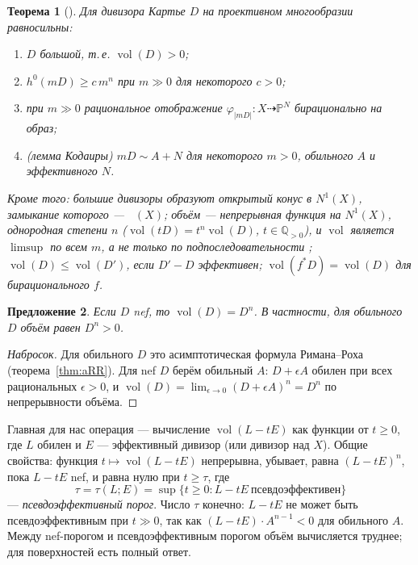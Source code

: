 \documentclass[11pt,a4paper]{article}
\theoremstyle{plain}
\newtheorem{theorem}{Теорема}[section]
\newtheorem{proposition}[theorem]{Предложение}
\theoremstyle{definition}
\theoremstyle{remark}
\newcommand{\Q}{\mathbb{Q}}
\newcommand{\PP}{\mathbb{P}}
\DeclareMathOperator{\vol}{vol}
\DeclareMathOperator{\Eff}{\overline{Eff}}
\begin{document}
\begin{theorem}[{\cite[2.2]{La}}]\label{thm:big}
Для дивизора Картье $D$ на проективном многообразии равносильны:
\begin{enumerate}
\item $D$ большой, т.\,е. $\vol(D)>0$;
\item $h^0(mD)\ge c\,m^n$ при $m\gg0$ для некоторого $c>0$;
\item при $m\gg0$ рациональное отображение $\varphi_{|mD|}\colon X\dashrightarrow\PP^N$ бирационально
на образ;
\item (\emph{лемма Кодаиры}) $mD\sim A+N$ для некоторого $m>0$, обильного $A$ и эффективного $N$.
\end{enumerate}
Кроме того: большие дивизоры образуют открытый конус в $N^1(X)$, замыкание которого --- $\Eff(X)$;
объём --- непрерывная функция на $N^1(X)$, однородная степени $n$ ($\vol(tD)=t^n\vol(D)$,
$t\in\Q_{>0}$), и $\vol$ является $\limsup$ по всем $m$, а не только по подпоследовательности
\cite[2.2.C]{La}; $\vol(D)\le\vol(D')$, если $D'-D$ эффективен; $\vol(f^*D)=\vol(D)$ для
бирационального $f$.
\end{theorem}

\begin{proposition}\label{prop:vol-nef}
Если $D$ nef, то $\vol(D)=D^n$. В частности, для обильного $D$ объём равен $D^n>0$.
\end{proposition}
\begin{proof}[Набросок]
Для обильного $D$ это асимптотическая формула Римана--Роха (теорема~\ref{thm:aRR}). Для nef $D$
берём обильный $A$: $D+\epsilon A$ обилен при всех рациональных $\epsilon>0$, и
$\vol(D)=\lim_{\epsilon\to0}(D+\epsilon A)^n=D^n$ по непрерывности объёма.
\end{proof}

Главная для нас операция --- вычисление $\vol(L-tE)$ как функции от $t\ge0$, где $L$ обилен и $E$
--- эффективный дивизор (или дивизор над $X$). Общие свойства: функция $t\mapsto\vol(L-tE)$
непрерывна, убывает, равна $(L-tE)^n$, пока $L-tE$ nef, и равна нулю при $t\ge\tau$, где
\[
\tau=\tau(L;E)=\sup\{t\ge0: L-tE\ \text{псевдоэффективен}\}
\]
--- \emph{псевдоэффективный порог}. Число $\tau$ конечно: $L-tE$ не может быть псевдоэффективным
при $t\gg0$, так как $(L-tE)\cdot A^{n-1}<0$ для обильного $A$. Между nef-порогом и
псевдоэффективным порогом объём вычисляется труднее; для поверхностей есть полный ответ.
\end{document}
